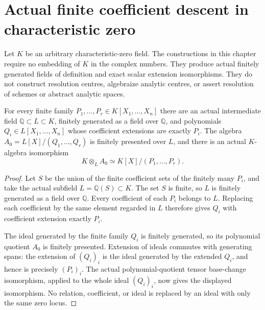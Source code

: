 \section{Actual finite coefficient descent in characteristic zero}

Let $K$ be an arbitrary characteristic-zero field. The constructions in
this chapter require no embedding of $K$ in the complex numbers. They
produce actual finitely generated fields of definition and exact scalar
extension isomorphisms. They do not construct resolution centres,
algebraize analytic centres, or assert resolution of schemes or abstract
analytic spaces.

\begin{theorem}
\label{hir:char-zero-finite-relations-coefficient-descent}
\leanok
{}
For every finite family $P_1,\ldots,P_r\in K[X_1,\ldots,X_n]$
there are an actual intermediate field $\mathbb Q\subset L\subset K$,
finitely generated as a field over $\mathbb Q$, and polynomials
$Q_i\in L[X_1,\ldots,X_n]$ whose coefficient extensions are exactly
$P_i$. The algebra $A_0=L[X]/(Q_1,\ldots,Q_r)$ is finitely presented
over $L$, and there is an actual $K$-algebra isomorphism
\[
 K\otimes_L A_0\simeq K[X]/(P_1,\ldots,P_r).
\]
\end{theorem}
\begin{proof}
Let $S$ be the union of the finite coefficient sets of the finitely
many $P_i$, and take the actual subfield $L=\mathbb Q(S)\subset K$.
The set $S$ is finite, so $L$ is finitely generated as a field over
$\mathbb Q$. Every coefficient of each $P_i$ belongs to $L$.
Replacing each coefficient by the same element regarded in $L$
therefore gives $Q_i$ with coefficient extension exactly $P_i$.

The ideal generated by the finite family $Q_i$ is finitely generated,
so its polynomial quotient $A_0$ is finitely presented. Extension of
ideals commutes with generating spans: the extension of $(Q_i)_i$
is the ideal generated by the extended $Q_i$, and hence is precisely
$(P_i)_i$. The actual polynomial-quotient tensor base-change
isomorphism, applied to the whole ideal $(Q_i)_i$, now gives the
displayed isomorphism. No relation, coefficient, or ideal is replaced
by an ideal with only the same zero locus.
\end{proof}



